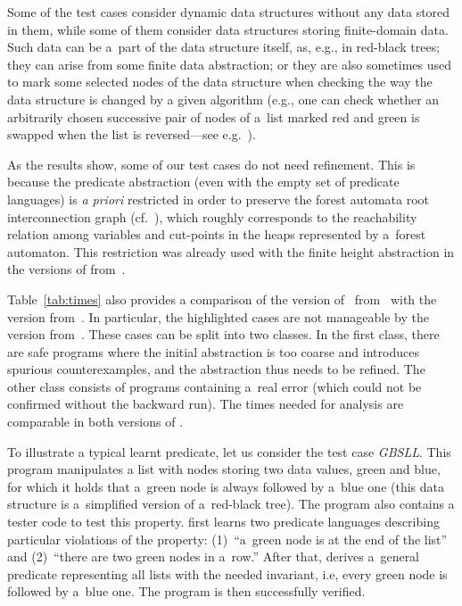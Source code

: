{Some of the test cases consider dynamic data structures without any data stored
in them, while some of them consider data structures storing finite-domain data.
Such data can
be a~part of the data structure itself, as, e.g., in red-black trees; they can
arise from some finite data abstraction; or they are also sometimes used to
mark some selected nodes of the data structure when checking the way the data
structure is changed by a given algorithm (e.g., one can check whether an
arbitrarily chosen successive pair of nodes of a~list marked red and green is
swapped when the list is reversed---see e.g.~\cite{artmc}).

As the results show, some of our test cases do not need refinement.
This is because the predicate abstraction (even with the empty set of predicate
languages) is \emph{a priori} restricted in order to preserve the forest automata root interconnection graph (cf.\ ),
which roughly corresponds to the reachability relation among variables and
cut-points in the heaps represented by a~forest automaton.
This restriction was already used with the
finite height abstraction in the versions of \forester
from~\cite{forester11,boxes13}.

Table~\ref{tab:times} also provides a comparison of the version of~\forester
from~\cite{boxes13} with the version from~\cite{vmcai17}.
In particular, the highlighted cases are not manageable by the version from~\cite{boxes13}.
These cases can be split into two classes.
In the first class, there are safe programs where the initial abstraction is too
coarse and introduces spurious counterexamples, and the abstraction thus needs
to be refined.
The other class consists of programs 
containing a~real error (which could not be confirmed without the backward run).
The times needed for analysis are comparable in both versions of \forester.

To illustrate a typical learnt predicate, let us consider the test case \mbox{\emph{GBSLL}}.
This program manipulates a list with nodes storing two data values, green and blue, for which it holds
that a~green node is always followed by a~blue one (this data structure is
a~simplified version of a~red-black tree).
The program also contains a tester code to test this property.
\forester{} first learns two predicate languages describing particular violations of the property:
(1)~``a~green node is at the end of the list'' and
(2)~``there are two green nodes in a~row.''
After that, \forester{} derives a~general predicate representing all lists with
the needed invariant, i.e, every green node is followed by a~blue one.
The program is then successfully verified. 

}
